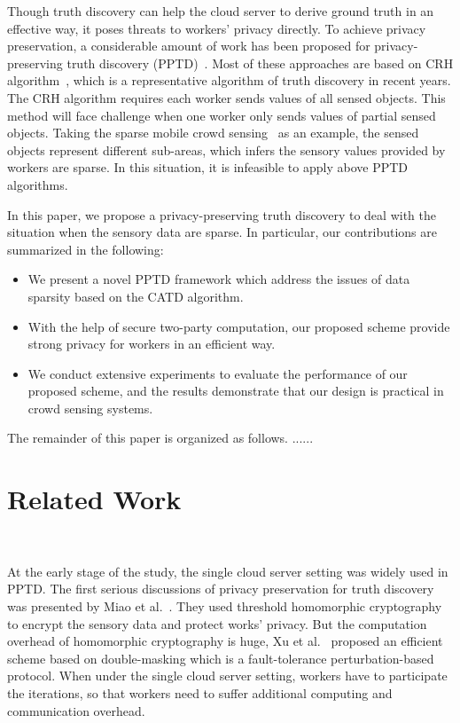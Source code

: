 \documentclass[conference]{IEEEtran}
\begin{document}
Though truth discovery can help the cloud server to derive ground truth in an effective way, it poses threats to workers' privacy directly.
To achieve privacy preservation, a considerable amount of work has been proposed for privacy-preserving truth discovery (PPTD)~\cite{miao_cloud-enabled_2015,xu_efficient_2019,zhang_reliable_2019,xue_inpptd_2020}.
Most of these approaches are based on CRH algorithm~\cite{li_resolving_2014}, which is a representative algorithm of truth discovery in recent years.
The CRH algorithm requires each worker sends values of all sensed objects.
This method will face challenge when one worker only sends values of partial sensed objects.
Taking the sparse mobile crowd sensing~\cite{wang_sparse_2016} as an example, the sensed objects represent different sub-areas, which infers the sensory values provided by workers are sparse.
In this situation, it is infeasible to apply above PPTD algorithms.

In this paper, we propose a privacy-preserving truth discovery to deal with the situation when the sensory data are sparse.
In particular, our contributions are summarized in the following:

\begin{itemize}
  \item We present a novel PPTD framework which address the issues of data sparsity based on the CATD algorithm.
  \item With the help of secure two-party computation, our proposed scheme provide strong privacy for workers in an efficient way.
  \item We conduct extensive experiments to evaluate the performance of our proposed scheme, and the results demonstrate that our design is practical in crowd sensing systems.
\end{itemize}

The remainder of this paper is organized as follows. ......


\section{Related Work}~\label{sec2}

At the early stage of the study, the single cloud server setting was widely used in PPTD.
The first serious discussions of privacy preservation for truth discovery was presented by Miao et al.~\cite{miao_cloud-enabled_2015}.
They used threshold homomorphic cryptography to encrypt the sensory data and protect works' privacy. 
But the computation overhead of homomorphic cryptography is huge, Xu et al.~\cite{xu_efficient_2019} proposed an efficient scheme based on double-masking which is a fault-tolerance perturbation-based protocol.
When under the single cloud server setting, workers have to participate the iterations, so that workers need to suffer additional computing and communication overhead.
\end{document}

